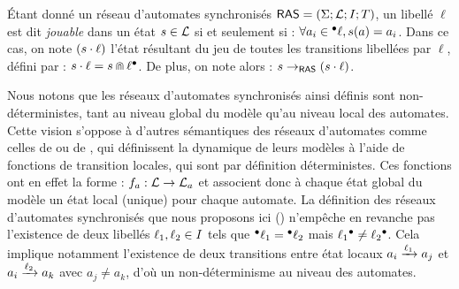 \begin{definition}
  Étant donné un réseau d'automates synchronisés $\mathsf{RAS} = (\Sigma; \mathcal{L}; I; T)$,
  un libellé $\ell$ est dit \emph{jouable} dans un état $s \in \mathcal{L}$ si et seulement si :
  $\forall a_i \in {}^\bullet \ell, s(a) = a_i$.
  Dans ce cas, on note $(s \cdot \ell)$ l'état résultant du jeu de toutes les transitions
  libellées par $\ell$, défini par :
  $s \cdot \ell = s \Cap \ell {}^\bullet$.
  De plus, on note alors : $s \rightarrow_{\mathsf{RAS}} (s \cdot \ell)$.
\end{definition}

\begin{remark}
  Nous notons que les réseaux d'automates synchronisés ainsi définis sont non-déterministes,
  tant au niveau global du modèle qu'au niveau local des automates.
  Cette vision s'oppose à d'autres sémantiques des réseaux d'automates
  comme celles de  ou de ,
  qui définissent la dynamique de leurs modèles à l'aide de fonctions de transition locales,
  qui sont par définition déterministes.
  Ces fonctions ont en effet la forme : $f_a : \mathcal{L} \rightarrow \mathcal{L}_a$
  et associent donc à chaque état global du modèle un état local (unique) pour chaque automate.
  La définition des réseaux d'automates synchronisés que nous proposons ici ()
  n'empêche en revanche pas l'existence de deux libellés $\ell_1, \ell_2 \in I$
  tels que ${}^\bullet \ell_1 = {}^\bullet \ell_2$ mais $\ell_1 {}^\bullet \neq \ell_2 {}^\bullet$.
  Cela implique notamment l'existence de deux transitions entre état locaux
  $a_i \xrightarrow{\ell_1} a_j$ et $a_i \xrightarrow{\ell_2} a_k$
  avec $a_j \neq a_k$, d'où un non-déterminisme au niveau des automates.
\end{remark}

